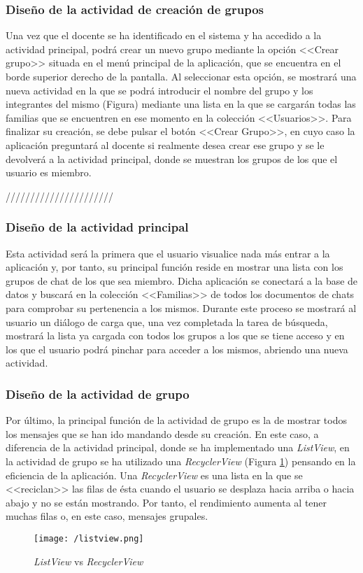 \subsubsection{Diseño de la actividad de creación de grupos}
Una vez que el docente se ha identificado en el sistema y ha accedido a la actividad principal, podrá crear un nuevo grupo mediante la opción <<Crear grupo>> situada en el menú principal de la aplicación, que se encuentra en el borde superior derecho de la pantalla. Al seleccionar esta opción, se mostrará una nueva actividad en la que se podrá introducir el nombre del grupo y los integrantes del mismo (Figura) mediante una lista en la que se cargarán todas las familias que se encuentren en ese momento en la colección <<Usuarios>>. Para finalizar su creación, se debe pulsar el botón <<Crear Grupo>>, en cuyo caso la aplicación preguntará al docente si realmente desea crear ese grupo y se le devolverá a la actividad principal, donde se muestran los grupos de los que el usuario es miembro.

//////////////////////

\subsubsection{Diseño de la actividad principal}
Esta actividad será la primera que el usuario visualice nada más entrar a la aplicación y, por tanto, su principal función reside en mostrar una lista con los grupos de chat de los que sea miembro. Dicha aplicación se conectará a la base de datos y buscará en la colección <<Familias>> de todos los documentos de chats para comprobar su pertenencia a los mismos. Durante este proceso se mostrará al usuario un diálogo de carga que, una vez completada la tarea de búsqueda, mostrará la lista ya cargada con todos los grupos a los que se tiene acceso y en los que el usuario podrá pinchar para acceder a los mismos, abriendo una nueva actividad.

\newpage

\subsubsection{Diseño de la actividad de grupo}
Por último, la principal función de la actividad de grupo es la de mostrar todos los mensajes que se han ido mandando desde su creación. En este caso, a diferencia de la actividad principal, donde se ha implementado una \textit{ListView}, en la actividad de grupo se ha utilizado una \textit{RecyclerView} (Figura \ref{fig:listview}) pensando en la eficiencia de la aplicación. Una \textit{RecyclerView} es una lista en la que se <<reciclan>> las filas de ésta cuando el usuario se desplaza hacia arriba o hacia abajo y no se están mostrando. Por tanto, el rendimiento aumenta al tener muchas filas o, en este caso, mensajes grupales.

\begin{figure}[!h]
	\begin{center}
		\texttt{[image: /listview.png]}
		\caption{\textit{ListView} vs \textit{RecyclerView}}
		\label{fig:listview}
	\end{center}
\end{figure}